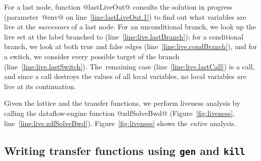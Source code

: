 \documentclass[blockstyle,preprint,natbib,nocopyrightspace]{sigplanconf}
\newcommand\lineref[1]{line~\ref{line:#1}}
\def\authornote#1{\unskip\relax}
\newcommand{\norman}[1]{\authornote{NR: #1}}
\let\remark\norman
\newcommand\seclabel[1]{\label{sec:#1}}
\newcommand\figref[1]{Figure~\ref{fig:#1}}
\begin{document}
For a last node, function @lastLiveOut@ consults the solution in
progress (parameter~@env@ on \lineref{lastLiveOut.1}) to find out what
variables are live at the \emph{successors} of a 
last node. 
For an unconditional branch, we look up the live set at the label
branched to (\lineref{live.lastBranch});
for a conditional branch, we look at both true and false edges
(\lineref{live.condBranch}), 
 and
for a switch, we consider every possible target of the
branch (\lineref{live.lastSwitch}).
The~remaining case (\lineref{live.lastCall}) is a call, 
and since a call destroys the values of all local variables, no
local variables are live at its continuation.

Given the lattice and the transfer functions,
we perform liveness analysis by calling
the dataflow-engine function @zdfSolveBwd@ (\figref{liveness},
\lineref{live.zdfSolveBwd}). 
\figref{liveness} shows the \emph{entire} analysis.



\ifgenkill
\subsection{Writing transfer functions using {\mdseries\texttt{gen}} and
{\mdseries\texttt{kill}}}



\seclabel{gen-kill}
\end{document}
